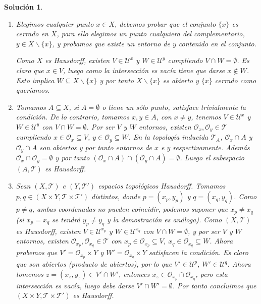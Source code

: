 \documentclass{article}
\theoremstyle{remark,bold} \newtheorem{exercise}{Ejercicio}
\newtheorem*{solution}{Solución}
\begin{document}
\begin{solution}
  
  \text{ }
  
  \begin{enumerate}

  \item Elegimos cualquier punto $x \in X$, debemos probar que el
    conjunto $\{x\}$ es cerrado en $X$, para ello elegimos un punto
    cualquiera del complementario, $y \in X \backslash \{x\}$, y probamos
    que existe un entorno de $y$ contenido en el conjunto.

    Como $X$ es Hausdorff, existen $V \in \mathcal{U}^x$ y $W \in
    \mathcal{U}^y$ cumpliendo $V \cap W = \emptyset$. Es claro que $x \in
    V$, luego como la intersección es vacía tiene que darse $x \notin
    W$. Esto implica $W \subseteq X \backslash \{x\}$ y por tanto $X
    \backslash \{x\}$ es abierto y $\{x\}$ cerrado como queríamos.

  \item Tomamos $A \subseteq X$, si $A = \emptyset$ o tiene un sólo
    punto, satisface trivialmente la condición. De lo contrario, tomamos
    $x, y \in A$, con $x \neq y$, tenemos $V \in \mathcal{U}^x$ y $W \in
    \mathcal{U}^y$ con $V \cap W = \emptyset$. Por ser $V$ y $W$ entornos,
    existen $\mathcal{O}_x,\mathcal{O}_y \in \mathcal{T}$ cumpliendo $x
    \in \mathcal{O}_x \subseteq V$, $y \in \mathcal{O}_y \subseteq W$. En
    la topología inducida $\mathcal{T}_A$, $\mathcal{O}_x \cap A$ y
    $\mathcal{O}_y \cap A$ son abiertos y por tanto entornos de $x$ e $y$
    respectivamente. Además $\mathcal{O}_x \cap \mathcal{O}_y = \emptyset$
    y por tanto $(\mathcal{O}_x \cap A) \cap (\mathcal{O}_y \cap A) =
    \emptyset$. Luego el subespacio $(A, \mathcal{T})$ es Hausdorff.

  \item Sean $(X, \mathcal{T})$ e $(Y, \mathcal{T}')$ espacios
    topológicos Hausdorff. Tomamos $p, q \in (X \times Y, \mathcal{T}
    \times \mathcal{T}')$ distintos, donde $p = (x_p,y_p)$ y $q =
    (x_q,y_q)$. Como $p \neq q$, ambas coordenadas no pueden coincidir,
    podemos suponer que $x_p \neq x_q$ (si $x_p = x_q$ se tendrá $y_p \neq
    y_q$ y la demostración es análoga). Como $(X, \mathcal{T})$ es
    Hausdorff, existen $V \in \mathcal{U}^{x_p}$ y $W \in
    \mathcal{U}^{x_q}$ con $V \cap W = \emptyset$, y por ser $V$ y $W$
    entornos, existen $\mathcal{O}_{x_p},\mathcal{O}_{x_q} \in
    \mathcal{T}$ con $x_p \in \mathcal{O}_{x_p} \subseteq V$, $x_q \in
    \mathcal{O}_{x_q} \subseteq W$. Ahora probemos que $V' =
    \mathcal{O}_{x_p} \times Y$ y $W' = \mathcal{O}_{x_q} \times Y$
    satisfacen la condición. Es claro que son abiertos (producto de
    abiertos), por lo que $V' \in \mathcal{U}^p$, $W' \in
    \mathcal{U}^q$. Ahora tomemos $z = (x_z,y_z) \in V' \cap W'$, entonces
    $x_z \in \mathcal{O}_{x_p} \cap \mathcal{O}_{x_q}$, pero esta
    intersección es vacía, luego debe darse $V' \cap W' = \emptyset$. Por
    tanto concluimos que $(X \times Y, \mathcal{T} \times \mathcal{T}')$
    es Hausdorff.


\end{enumerate}
\end{solution}
\end{document}
